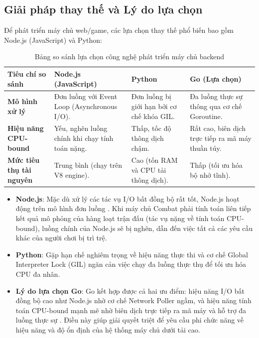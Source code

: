 \documentclass[../Project.tex]{subfiles}
\begin{document}
\subsection{Giải pháp thay thế và Lý do lựa chọn}
Để phát triển máy chủ web/game, các lựa chọn thay thế phổ biến bao gồm Node.js (JavaScript) và Python:
\begin{table}[H]
\centering
\begin{tabular}{|m{3.3cm}|m{3.3cm}|m{3.3cm}|m{3.3cm}|}
\hline
\textbf{Tiêu chí so sánh} & \textbf{Node.js (JavaScript)} & \textbf{Python} & \textbf{Go (Lựa chọn)} \\ \hline
\textbf{Mô hình xử lý} & Đơn luồng với Event Loop (Asynchronous I/O). & Đơn luồng bị giới hạn bởi cơ chế khóa GIL. & Đa luồng thực sự thông qua cơ chế Goroutine. \\ \hline
\textbf{Hiệu năng CPU-bound} & Yếu, nghẽn luồng chính khi chạy tính toán nặng. & Thấp, tốc độ thông dịch chậm. & Rất cao, biên dịch trực tiếp ra mã máy thuần túy. \\ \hline
\textbf{Mức tiêu thụ tài nguyên} & Trung bình (chạy trên V8 engine). & Cao (tốn RAM và CPU tải thông dịch). & Thấp (tối ưu hóa bộ nhớ tĩnh). \\ \hline
\end{tabular}
\caption{Bảng so sánh lựa chọn công nghệ phát triển máy chủ backend}
\label{tab:compare_go}
\end{table}

\begin{itemize}
    \item \textbf{Node.js}: Mặc dù xử lý các tác vụ I/O bất đồng bộ rất tốt, Node.js hoạt động trên mô hình đơn luồng \cite{nodejs2026}. Khi máy chủ Combat phải tính toán liên tiếp kết quả mô phỏng của hàng loạt trận đấu (tác vụ nặng về tính toán CPU-bound), luồng chính của Node.js sẽ bị nghẽn, dẫn đến việc tất cả các yêu cầu khác của người chơi bị trì trệ.
    \item \textbf{Python}: Gặp hạn chế nghiêm trọng về hiệu năng thực thi và cơ chế Global Interpreter Lock (GIL) ngăn cản việc chạy đa luồng thực thụ để tối ưu hóa CPU đa nhân.
    \item \textbf{Lý do lựa chọn Go}: Go kết hợp được cả hai ưu điểm: hiệu năng I/O bất đồng bộ cao như Node.js nhờ cơ chế Network Poller ngầm, và hiệu năng tính toán CPU-bound mạnh mẽ nhờ biên dịch trực tiếp ra mã máy và hỗ trợ đa luồng thực sự \cite{donovan2015go}. Điều này giúp giải quyết triệt để yêu cầu phi chức năng về hiệu năng và độ ổn định của hệ thống máy chủ dưới tải cao.
\end{itemize}
\end{document}
